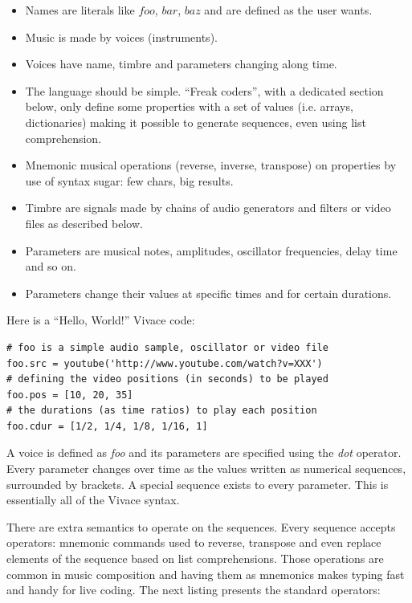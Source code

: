 \documentclass[letterpaper, 12pt]{article}
\begin{document}
{\begin{itemize}
  
\item Names are literals like $foo$, $bar$, $baz$ and are defined as
  the user wants.
\item Music is made by voices (instruments).
\item Voices have name, timbre and parameters changing along time.
\item The language should be simple. ``Freak coders'', with a
  dedicated section below, only define some properties with a set of
  values (i.e. arrays, dictionaries) making it possible to generate
  sequences, even using list comprehension.
\item Mnemonic musical operations (reverse, inverse, transpose) on
  properties by use of syntax sugar: few chars, big results.
\item Timbre are signals made by chains of audio generators and
  filters or video files as described below.
\item Parameters are musical notes, amplitudes, oscillator
  frequencies, delay time and so on.
\item Parameters change their values at specific times and for certain
  durations.
\end{itemize}

Here is a ``Hello, World!'' Vivace code:

\begin{Verbatim}[fontfamily=courier, xleftmargin=\parindent]
# foo is a simple audio sample, oscillator or video file
foo.src = youtube('http://www.youtube.com/watch?v=XXX')
# defining the video positions (in seconds) to be played
foo.pos = [10, 20, 35]
# the durations (as time ratios) to play each position
foo.cdur = [1/2, 1/4, 1/8, 1/16, 1]
\end{Verbatim}

A voice is defined as \textit{foo} and its parameters are specified
using the \textit{dot} operator. Every parameter changes over time as
the values written as numerical sequences, surrounded by brackets. A
special sequence exists to every parameter. This is essentially all of
the Vivace syntax.

There are extra semantics to operate on the sequences. Every sequence
accepts operators: mnemonic commands used to reverse, transpose and
even replace elements of the sequence based on list
comprehensions. Those operations are common in music composition and
having them as mnemonics makes typing fast and handy for live
coding. The next listing presents the standard operators:

}
\end{document}

